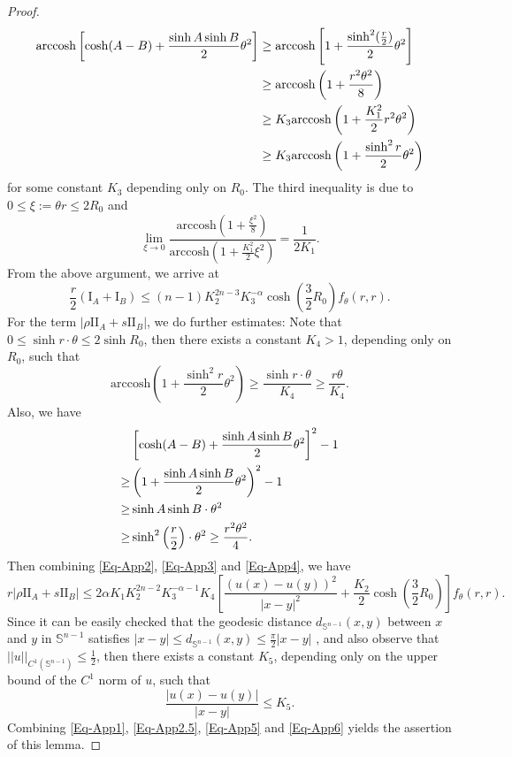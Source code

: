 \documentclass[11pt,reqno]{amsart}
\theoremstyle{definition}
\theoremstyle{remark}
\numberwithin{equation}{section}
\renewcommand{\(}{\left(}
\renewcommand{\)}{\right)}
\renewcommand{\-}{\overline}
\begin{document}
\begin{proof}
\begin{align}
	\mathrm{arccosh}\left[\cosh(A-B)+\frac{\sinh A\sinh B}{2}\theta^2\right]&\geq\mathrm{arccosh}\left[1+\frac{\sinh^2(\frac{r}{2})}{2}\theta^2\right]\notag\\
	&\geq \mathrm{arccosh}\left(1+\frac{r^2\theta^2}{8}\right)\notag\\
	&\geq K_3 \mathrm{arccosh}\left(1+\frac{K_1^2}{2}r^2\theta^2\right)\notag\\
	&\geq K_3\mathrm{arccosh}\left(1+\frac{\sinh^2 r}{2}\theta^2\right)\label{Eq-App2}
\end{align}
for some constant $K_3$ depending only on $R_0$. The third inequality is due to $0\leq \xi:=\theta r\leq 2R_0$ and 
\begin{equation*}
	\lim_{\xi\to 0}\frac{\mathrm{arccosh}\left(1+\frac{\xi^2}{8}\right)}{\mathrm{arccosh}\left(1+\frac{K_1^2}{2}\xi^2\right)}=\frac{1}{2K_1}.
\end{equation*}
From the above argument, we arrive at
\begin{equation}\label{Eq-App2.5}
	\frac{r}{2}\left(\text{I}_A+\text{I}_B\right)\leq (n-1)K_2^{2n-3}K_3^{-\alpha}\cosh\left(\frac{3}{2}R_0\right)f_{\theta}(r,r).
\end{equation}
For the term $|\rho\text{II}_A+s\text{II}_B|$, we do further estimates: Note that $0\leq \sinh r\cdot\theta\leq 2\sinh R_0$, then there exists a constant $K_4>1$, depending only on $R_0$, such that 
\begin{equation}\label{Eq-App3}
	\mathrm{arccosh}\left(1+\frac{\sinh^2 r}{2}\theta^2\right)\geq \frac{\sinh r\cdot\theta}{K_4}\geq\frac{r\theta}{K_4}.
\end{equation}
Also, we have 
\begin{align}
	&\left[\cosh(A-B)+\frac{\sinh A\sinh B}{2}\theta^2\right]^2-1\notag\\
	\geq&\left(1+\frac{\sinh A\sinh B}{2}\theta^2\right)^2-1\notag\\
	\geq&\sinh A\sinh B\cdot\theta^2\notag\\
	\geq&\sinh^2\left(\frac{r}{2}\right)\cdot\theta^2\geq\frac{r^2\theta^2}{4}.\label{Eq-App4}
\end{align}
Then combining \eqref{Eq-App2}, \eqref{Eq-App3} and \eqref{Eq-App4}, we have
\begin{equation}\label{Eq-App5}
  r|\rho\text{II}_A+s\text{II}_B|\leq 2\alpha K_1 K_2^{2n-2} K_3^{-\alpha-1}K_4\left[\frac{\left(u(x)-u(y)\right)^2}{|x-y|^2}+\frac{K_2}{2}\cosh\left(\frac{3}{2}R_0\right)\right]f_{\theta}(r,r).
\end{equation}
Since it can be easily checked that the geodesic distance $d_{\mathbb{S}^{n-1}}(x,y)$ between $x$ and $y$ in $\mathbb{S}^{n-1}$ satisfies $|x-y|\leq d_{\mathbb{S}^{n-1}}(x,y)\leq \frac{\pi}{2}|x-y|$
, and also observe that $||u||_{C^1(\mathbb{S}^{n-1})}\leq\frac{1}{2}$, then there exists a constant $K_5$, depending only on the upper bound of the $C^1$ norm of $u$, such that 
\begin{equation}\label{Eq-App6}
	\frac{|u(x)-u(y)|}{|x-y|}\leq K_5.
\end{equation}
Combining \eqref{Eq-App1}, \eqref{Eq-App2.5}, \eqref{Eq-App5} and \eqref{Eq-App6} yields the assertion of this lemma.
\end{proof}
\end{document}
